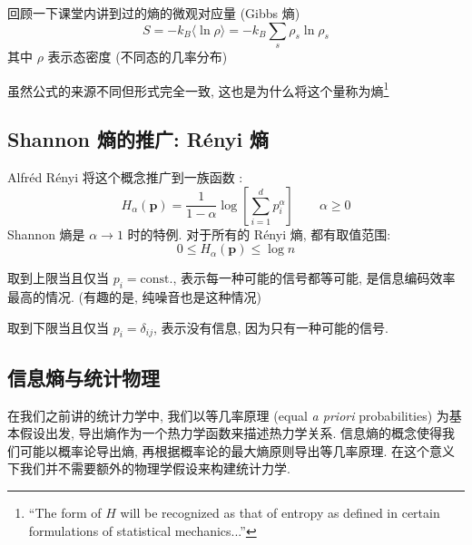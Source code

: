 \documentclass[12pt,a4paper]{article}
\renewcommand*{\vec}[1]{\bm{#1}}
\begin{document}
    回顾一下课堂内讲到过的熵的微观对应量 (Gibbs 熵)
    $$
        S = -k_B\langle\ln\rho\rangle = -k_B\sum_s\rho_s\ln\rho_s
    $$
    其中 $\rho$ 表示态密度 (不同态的几率分布)

    虽然公式的来源不同但形式完全一致, 这也是为什么将这个量称为熵\footnote{``The form of $H$ will be recognized as that of entropy as defined in certain formulations of statistical mechanics...''\cite{Shannonentropy}}

\subsection{Shannon 熵的推广: R\'enyi 熵} %
\label{sub:Renyi_entropy}
    Alfr\'ed R\'enyi 将这个概念推广到一族函数\cite{renyientropy} :
    \begin{equation}
        H_\alpha(\vec p) = \frac1{1-\alpha}\log\left[\sum_{i=1}^dp_i^\alpha\right]\qquad\alpha\ge 0
    \end{equation}
    Shannon 熵是 $\alpha\to 1$ 时的特例. 对于所有的 R\'enyi 熵, 都有取值范围:
    \begin{equation}
        0\le H_\alpha(\vec p) \le\log n
    \end{equation}

    取到上限当且仅当 $p_i = \mbox{const.}$, 表示每一种可能的信号都等可能, 
    是信息编码效率最高的情况. (有趣的是, 纯噪音也是这种情况)

    取到下限当且仅当 $p_i = \delta_{ij}$, 表示没有信息, 因为只有一种可能的信号.
\subsection{信息熵与统计物理} %
\label{sub:Info_entropy_and_thermo}
    在我们之前讲的统计力学中, 
    我们以等几率原理 (equal \textit{a priori} probabilities) 为基本假设出发, 
    导出熵作为一个热力学函数来描述热力学关系. 
    信息熵的概念使得我们可能以概率论导出熵, 
    再根据概率论的最大熵原则导出等几率原理. 
    在这个意义下我们并不需要额外的物理学假设来构建统计力学\cite{ITSM.PhysRev.106.620,ITSM2.PhysRev.108.171}.
\end{document}
